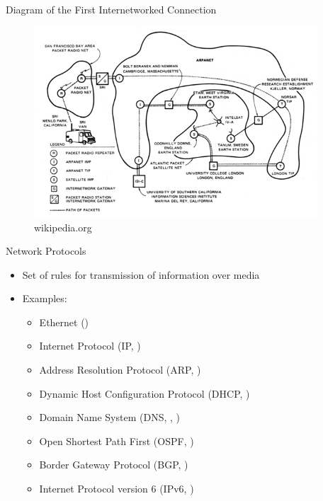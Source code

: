 \begin{frame}{Diagram of the First Internetworked Connection}
	\begin{figure}
		\includegraphics[width=300pt]{../common/images/SRI_First_Internetworked_Connection_diagram.jpg}\\
		{\scriptsize wikipedia.org}
	\end{figure}
\end{frame}

\begin{frame}{Network Protocols}
	\begin{itemize}[<+->]
		\item Set of rules for transmission of information over media
		\item Examples:
		\begin{itemize}
			\item Ethernet ()
			\item Internet Protocol (IP, )
			\item Address Resolution Protocol (ARP, )
			\item Dynamic Host Configuration Protocol (DHCP, )
			\item Domain Name System (DNS, , )
			\item Open Shortest Path First (OSPF, )
			\item Border Gateway Protocol (BGP, )
			\item Internet Protocol version 6 (IPv6, )
		\end{itemize}
	\end{itemize}
\end{frame}

